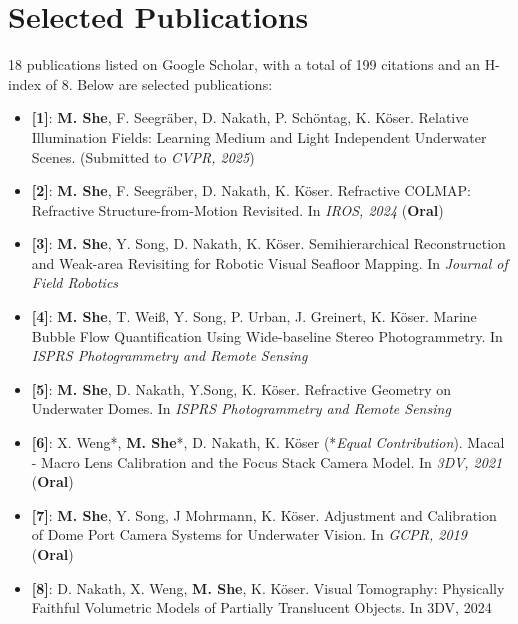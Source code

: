 \documentclass[letterpaper,11pt]{article}
\newcommand{\resumeItem}[2]{
  \item\small{
    \textbf{#1}{: #2 \vspace{-2pt}}
  }
}
\newcommand{\resumeSubHeadingListStart}{\begin{itemize}[leftmargin=*]}
\newcommand{\resumeSubHeadingListEnd}{\end{itemize}}
\begin{document}
\section{Selected Publications}
18 publications listed on Google Scholar, with a total of 199 citations and an H-index of 8. Below are selected publications:
 \resumeSubHeadingListStart
 \resumeItem{[1]}{\textbf{M. She}, F. Seegr\"aber, D. Nakath, P. Sch\"ontag, K. K\"oser. Relative Illumination Fields: Learning Medium and Light Independent Underwater Scenes. (Submitted to \textit{CVPR, 2025})}
 \resumeItem{[2]}{\textbf{M. She}, F. Seegr\"aber, D. Nakath, K. K\"oser. Refractive COLMAP: Refractive Structure-from-Motion Revisited. In \textit{IROS, 2024} (\textbf{Oral})}
 \resumeItem{[3]}{\textbf{M. She}, Y. Song, D. Nakath, K. K\"oser. Semihierarchical Reconstruction and Weak-area Revisiting for Robotic Visual Seafloor Mapping. In \textit{Journal of Field Robotics}}
 \resumeItem{[4]}{\textbf{M. She}, T. Wei\ss, Y. Song, P. Urban, J. Greinert, K. K\"oser. Marine Bubble Flow Quantification Using Wide-baseline Stereo Photogrammetry. In \textit{ISPRS Photogrammetry and Remote Sensing}}
 \resumeItem{[5]}{\textbf{M. She}, D. Nakath, Y.Song, K. K\"oser. Refractive Geometry on Underwater Domes. In \textit{ISPRS Photogrammetry and Remote Sensing}}
 \resumeItem{[6]}{X. Weng*, \textbf{M. She}*, D. Nakath, K. K\"oser (*\textit{Equal Contribution}). Macal - Macro Lens Calibration and the Focus Stack Camera Model. In \textit{3DV, 2021} (\textbf{Oral})}
 \resumeItem{[7]}{\textbf{M. She}, Y. Song, J Mohrmann, K. K\"oser. Adjustment and Calibration of Dome Port Camera Systems for Underwater Vision. In \textit{GCPR, 2019} (\textbf{Oral})}
 \resumeItem{[8]}{D. Nakath, X. Weng, \textbf{M. She}, K. K\"oser. Visual Tomography: Physically Faithful Volumetric Models of Partially Translucent Objects. In 3DV, 2024}
 \resumeSubHeadingListEnd

%


\end{document}
